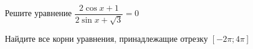 \begin{ex}
	\begin{condition}
		\begin{enumcols}[label=\asbuk*)]
			\item Решите уравнение \( \dfrac{2\cos  x+1}{2 \sin x + \sqrt{3}} =0 \)
			\item Найдите все корни уравнения, принадлежащие отрезку \( \left[-2\pi;4\pi\right] \)
		\end{enumcols}
	\end{condition}
\end{ex}